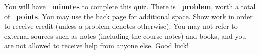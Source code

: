 \begin{tcolorbox}[enhanced,attach boxed title to top center=
	{yshift=-2mm,yshifttext=-1mm},colback=white,colframe=black,colbacktitle=black,title={\textbf{Instructions}}]
	You will have \textbf{\quiztime\ minutes} to complete this quiz. There is \textbf{\quizproblemcount\ problem}, worth a total of \textbf{\quizproblemweight\ points}. You may use the back page for additional space. Show work in order to receive credit (unless a problem denotes otherwise). You may not refer to external sources such as notes (including the course notes) and books, and you are not allowed to receive help from anyone else. Good luck!
\end{tcolorbox}